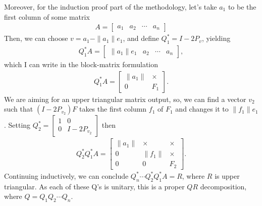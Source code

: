 \documentclass{ximera}
\begin{document}
Moreover, for the induction proof part of the methodology, let's take $a_1$ to be the first column of some matrix 
\begin{align*}
    A = \left[\begin{array}{c|c|c|c} 
    a_1 & a_2 & \cdots & a_n
    \end{array}\right]
\end{align*}
Then, we can choose $v = a_1 - \|a_1\|e_1$, and define $Q_1^* = I- 2P_v$, yielding
\begin{align*}
        Q_1^*A = \left[\begin{array}{c|c|c|c} 
        \|a_1\|e_1 & a_2 & \cdots & a_n
        \end{array}\right],
\end{align*}
which I can write in the block-matrix formulation
\begin{align*}
    Q_1^*A = \left[ \begin{array}{c|c} 
    \|a_1\| & \times \\\hline
    0 & F_1
    \end{array}\right].
\end{align*}
We are aiming for an upper triangular matrix output, so, we can find a vector $v_2$ such that $(I-2P_{v_2})F$  takes the first column $f_1$ of $F_1$ and changes it to $\|f_1\|e_1$.  Setting $Q_2^* = \left[ \begin{array}{c|c} 
    1 & 0 \\\hline
    0 & I-2P_{v_2}
    \end{array}\right]$
then 
\begin{align*}
    Q_2^*Q_1^*A = \left[ \begin{array}{c|c|c} 
    \|a_1\| & \times & \times \\\hline
    0 & \|f_1\| & \times \\ \hline
    0 & 0 & F_2
    \end{array}\right].
\end{align*}
Continuing inductively, we can conclude
$Q_n^* \cdots Q_2^*Q_1^*A = R$, where $R$ is upper triangular.  As each of these Q's is unitary, this is a proper $QR$ decomposition, where $Q = Q_1Q_2 \cdots Q_n$.
\end{document}

